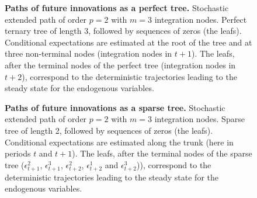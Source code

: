 \documentclass[a4paper,11pt]{amsart}
\makeatletter
\newcommand{\addresseshere}{%
  \enddoc@text\let\enddoc@text\relax
}
\makeatother
\begin{document}
\addresseshere


\newpage
\appendix

\begin{figure}[H]
   \centering
   {\tiny
      }
   \bigskip\bigskip
   \caption{\textbf{Paths of  future innovations as a perfect tree.} Stochastic extended path of order $p=2$ with $m=3$ integration nodes. Perfect ternary tree of length 3, followed by sequences of zeros (the leafs). Conditional expectations are estimated at the root of the tree and at three non-terminal nodes (integration nodes in $t+1$). The leafs, after the terminal nodes of the perfect tree (integration nodes in $t+2$), correspond to the deterministic trajectories leading to the steady state for the endogenous variables.}
   \label{fig:sep:tree}
\end{figure}


\begin{figure}[H]
   \centering
   {\tiny
      }
   \bigskip\bigskip
   \caption{\textbf{Paths of  future innovations as a sparse tree.} Stochastic extended path of order $p=2$ with $m=3$ integration nodes. Sparse tree of length 2, followed by sequences of zeros (the leafs). Conditional expectations are estimated along the trunk (here in periods $t$ and $t+1$). The leafs, after the terminal nodes of the sparse tree ($\epsilon_{t+1}^2$, $\epsilon_{t+1}^3$, $\epsilon_{t+2}^2$, $\epsilon_{t+2}^1$ and $\epsilon_{t+2}^3$)), correspond to the deterministic trajectories leading to the steady state for the endogenous variables.}
   \label{fig:sep:sparse-tree}
\end{figure}
\end{document}
